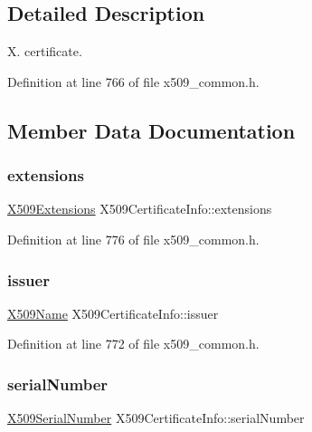 \subsection{Detailed Description}
X. certificate. 

Definition at line 766 of file x509\+\_\+common.\+h.



\subsection{Member Data Documentation}
\mbox{\label{structX509CertificateInfo_a6fbc847cf3a3459834fae3c4ece76297}} 
\subsubsection{\texorpdfstring{extensions}{extensions}}
{\footnotesize\ttfamily \hyperlink{structX509Extensions}{X509\+Extensions} X509\+Certificate\+Info\+::extensions}



Definition at line 776 of file x509\+\_\+common.\+h.

\mbox{\label{structX509CertificateInfo_a21948b3fc93a9d531e6855243c5681c7}} 
\subsubsection{\texorpdfstring{issuer}{issuer}}
{\footnotesize\ttfamily \hyperlink{structX509Name}{X509\+Name} X509\+Certificate\+Info\+::issuer}



Definition at line 772 of file x509\+\_\+common.\+h.

\mbox{\label{structX509CertificateInfo_a7e16de43b3c58b80c62fbd633d4f1a42}} 
\subsubsection{\texorpdfstring{serial\+Number}{serialNumber}}
{\footnotesize\ttfamily \hyperlink{structX509SerialNumber}{X509\+Serial\+Number} X509\+Certificate\+Info\+::serial\+Number}



